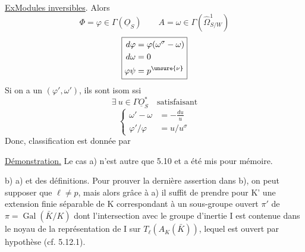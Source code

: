\uline{Ex}\qquad\uline{Modules inversibles}. Alors
\[
\Phi=\varphi\in\Gamma(\underline O_S)\qquad A=\omega\in\Gamma(\widehat\Omega^1_{S/W})
\]
\[
\boxed{\begin{aligned}
d\varphi&=\varphi(\omega^\sigma-\omega)\\
d\omega&=0\\
\varphi\psi&=p^{\unsure{\nu}}
\end{aligned}}
\]
Si on a un  $(\varphi',\omega')$, ils sont isom ssi
\[
\exists\ u\in\Gamma\underline O_S^*\quad\text{satisfaisant}
\]
\[
\boxed{\left\{\begin{aligned}
\omega'-\omega&=-\frac{du}{u}\\
\varphi'/\varphi&=u/u^\sigma
\end{aligned}\right.}
\]
Donc, classification est donnée par 

\uline{Démonstration.} Le cas a) n'est autre que 5.10 et a été mis pour mémoire.

b)  a) et des définitions. Pour prouver la dernière assertion dans b), on peut  supposer que $\ell\ne p$, mais alors grâce à a) il suffit de prendre pour K' une extension finie séparable de K correspondant à un sous-groupe ouvert $\pi'$ de $\pi=\operatorname{Gal}(\bar K/K)$ dont l'intersection avec le groupe d'inertie I est contenue dans le  noyau de la représentation de I sur $T_\ell(A_K(\bar K))$, lequel est  ouvert par hypothèse (cf. 5.12.1).

